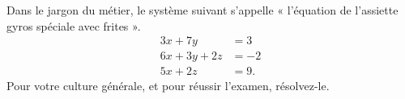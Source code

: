 \begin{exercice}\label{exoMatlab0032}

Dans le jargon du métier, le système suivant s'appelle « l'équation de l'assiette gyros spéciale avec frites ».
\begin{align*}
3x+7y&=3 \\
6x+3y+2z&=-2 \\
5x+2z&=9 .
\end{align*}
Pour votre culture générale, et pour réussir l'examen, résolvez-le.

\end{exercice}
